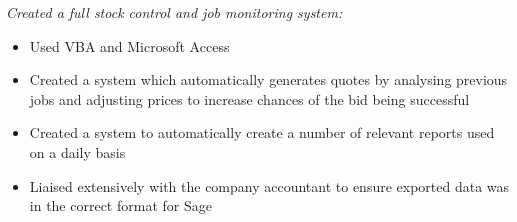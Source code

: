 \item \textit{Created a full stock control and job monitoring system:}
    \begin{itemize}%
        \item Used VBA and Microsoft Access
        \item Created a system which automatically generates quotes by analysing previous jobs and adjusting prices to increase chances of the bid being successful
        \item Created a system to automatically create a number of relevant reports used on a daily basis
        \item Liaised extensively with the company accountant to ensure exported data was in the correct format for Sage
    \end{itemize}
    \bigbreak
